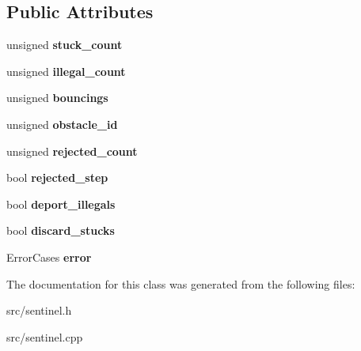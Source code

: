 \subsection*{Public Attributes}
\begin{DoxyCompactItemize}
\item 
\mbox{\label{classsentinels_1_1_sentinel_a7c588d3516d0576ccd319cfffa2ba1ee}} 
unsigned {\bfseries stuck\+\_\+count}
\item 
\mbox{\label{classsentinels_1_1_sentinel_ae63b02f83c9738eb01a85268279ebb52}} 
unsigned {\bfseries illegal\+\_\+count}
\item 
\mbox{\label{classsentinels_1_1_sentinel_a117da1c60b611dcf0780f21b9b4bcfff}} 
unsigned {\bfseries bouncings}
\item 
\mbox{\label{classsentinels_1_1_sentinel_a934aa2e258cfed479b293bd6fa546b4d}} 
unsigned {\bfseries obstacle\+\_\+id}
\item 
\mbox{\label{classsentinels_1_1_sentinel_aa1711693186810c3b3db9d6d25d43373}} 
unsigned {\bfseries rejected\+\_\+count}
\item 
\mbox{\label{classsentinels_1_1_sentinel_abf75c99c36d1155320b934ae2f9a8f82}} 
bool {\bfseries rejected\+\_\+step}
\item 
\mbox{\label{classsentinels_1_1_sentinel_af1f6fc70d0048859742b3df027b1e775}} 
bool {\bfseries deport\+\_\+illegals}
\item 
\mbox{\label{classsentinels_1_1_sentinel_ae542b64ba62eabadab040447ae23f960}} 
bool {\bfseries discard\+\_\+stucks}
\item 
\mbox{\label{classsentinels_1_1_sentinel_a1c163213e6a40e1d935d5eb6333b5b62}} 
Error\+Cases {\bfseries error}
\end{DoxyCompactItemize}


The documentation for this class was generated from the following files\+:\begin{DoxyCompactItemize}
\item 
src/sentinel.\+h\item 
src/sentinel.\+cpp\end{DoxyCompactItemize}
